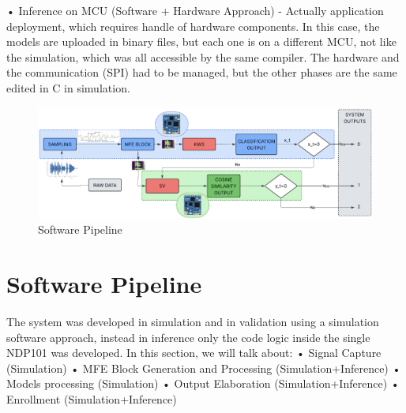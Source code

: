• Inference on MCU (Software + Hardware Approach) - Actually application deployment, which requires handle of hardware components. In this case, the models are uploaded in binary files, but each one is on a different MCU, not like the simulation, which was all accessible by the same compiler. The hardware and the communication (SPI) had to be managed, but the other phases are the same edited in C in simulation.\newline
\begin{center}
    \centering
    \begin{figure}[!h]
        \includegraphics[width=1.0\textwidth]{images/4.01 Software Pipeline.png}
        \caption{Software Pipeline}
    \end{figure}
\end{center}
\section{Software Pipeline}
\label{sec:sw pipeline}
The system was developed in simulation and in validation using a simulation software approach, instead in inference only the code logic inside the single NDP101 was developed. In this section, we will talk about:\newline
• Signal Capture (Simulation)\newline
• MFE Block Generation and Processing (Simulation+Inference\footnotemark{})\newline
• Models processing (Simulation)\newline
• Output Elaboration (Simulation+Inference)\newline
• Enrollment (Simulation+Inference)

